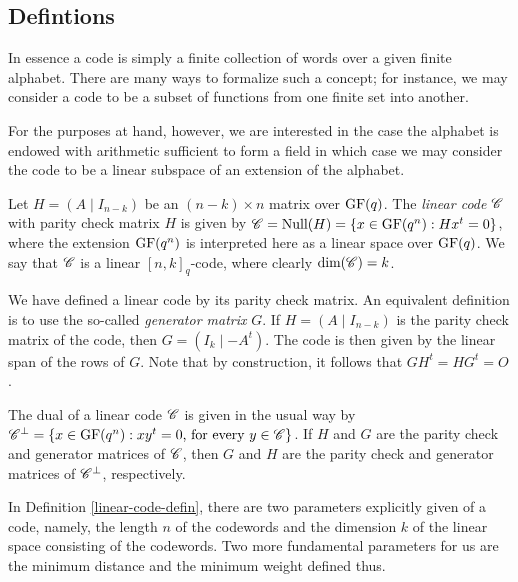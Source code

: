 \documentclass[../../../main]{subfiles}
\begin{document}
\subsection{Defintions}

In essence a code is simply a finite collection of words over a given finite
alphabet. There are many ways to formalize such a concept; for instance, we may
consider a code to be a subset of functions from one finite set into another.

For the purposes at hand, however, we are interested in the case the alphabet is
endowed with arithmetic sufficient to form a field in which case we may consider
the code to be a linear subspace of an extension of the alphabet.

\begin{defin}\label{linear-code-defin}
 Let $H=(A \mid I_{n-k})$ be an $(n-k) \times n$ matrix over $\text{GF}(q)$. The {\it linear code} $\mathscr{C}$ with parity check matrix $H$ is given by $\mathscr{C} = \text{Null}(H) = \{x \in \text{GF}(q^n) : Hx^t = 0\}$, where the extension $\text{GF}(q^n)$ is interpreted here as a linear space over $\text{GF}(q)$. We say that $\mathscr{C}$ is a linear $[n,k]_q$-code, where clearly $\text{dim}(\mathscr{C}) = k$.
\end{defin}

We have defined a linear code by its parity check matrix. An equivalent definition is to use the so-called {\it generator matrix} $G$. If $H=(A \mid I_{n-k})$ is the parity check matrix of the code, then $G=(I_k \mid -A^t)$. The code is then given by the linear span of the rows of $G$. Note that by construction, it follows that $GH^t = HG^t = O$.

The dual of a linear code $\mathscr{C}$ is given in the usual way by $\mathscr{C}^\perp = \{x \in \text{GF}(q^n) : xy^t=0 \text{, for every }y\in\mathscr{C}\}$. If $H$ and $G$ are the parity check and generator matrices of $\mathscr{C}$, then $G$ and $H$ are the parity check and generator matrices of $\mathscr{C}^\perp$, respectively.

In Definition \ref{linear-code-defin}, there are two parameters explicitly given of a code, namely, the length $n$ of the codewords and the dimension $k$ of the linear space consisting of the codewords. Two more fundamental parameters for us are the minimum distance and the minimum weight defined thus.
\end{document}
